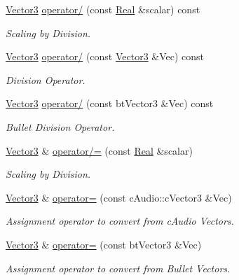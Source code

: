 \begin{DoxyCompactItemize}
\hyperlink{classphys_1_1Vector3}{Vector3} \hyperlink{classphys_1_1Vector3_a4bb5377ad78c299b40a8bc9fb66a902f}{operator/} (const \hyperlink{namespacephys_af7eb897198d265b8e868f45240230d5f}{Real} \&scalar) const 
\begin{DoxyCompactList}\small\item\em Scaling by Division. \item\end{DoxyCompactList}\item 
\hyperlink{classphys_1_1Vector3}{Vector3} \hyperlink{classphys_1_1Vector3_a75bb5dd58d66a039a1a651398417110f}{operator/} (const \hyperlink{classphys_1_1Vector3}{Vector3} \&Vec) const 
\begin{DoxyCompactList}\small\item\em Division Operator. \item\end{DoxyCompactList}\item 
\hyperlink{classphys_1_1Vector3}{Vector3} \hyperlink{classphys_1_1Vector3_a998a6b51433f43ac8b9434279137a1dd}{operator/} (const btVector3 \&Vec) const 
\begin{DoxyCompactList}\small\item\em Bullet Division Operator. \item\end{DoxyCompactList}\item 
\hyperlink{classphys_1_1Vector3}{Vector3} \& \hyperlink{classphys_1_1Vector3_abf6d1850c3ce246a0d8b038f0f5ec46c}{operator/=} (const \hyperlink{namespacephys_af7eb897198d265b8e868f45240230d5f}{Real} \&scalar)
\begin{DoxyCompactList}\small\item\em Scaling by Division. \item\end{DoxyCompactList}\item 
\hyperlink{classphys_1_1Vector3}{Vector3} \& \hyperlink{classphys_1_1Vector3_aef23e947ca4e3f24a34ccbcb412d24b5}{operator=} (const cAudio::cVector3 \&Vec)
\begin{DoxyCompactList}\small\item\em Assignment operator to convert from cAudio Vectors. \item\end{DoxyCompactList}\item 
\hyperlink{classphys_1_1Vector3}{Vector3} \& \hyperlink{classphys_1_1Vector3_a6bf00999b090258a0acb96368aa1bf38}{operator=} (const btVector3 \&Vec)
\begin{DoxyCompactList}\small\item\em Assignment operator to convert from Bullet Vectors. \item\end{DoxyCompactList}\item 

\end{DoxyCompactItemize}
